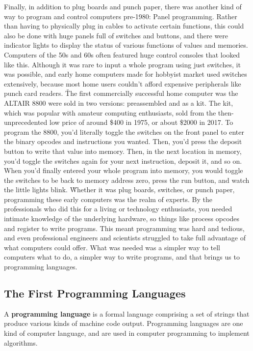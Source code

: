Finally, in addition to plug boards and punch paper, there was another kind of way to program and control computers
pre-1980: Panel programming. Rather than having to physically plug in cables to activate certain functions, this
could also be done with huge panels full of switches and buttons, and there were indicator lights to display the
status of various functions of values and memories. Computers of the 50s and 60s often featured huge control consoles
that looked like this. Although it was rare to input a whole program using just switches, it was possible, and early
home computers made for hobbyist market used switches extensively, because most home users couldn't afford expensive
peripherals like punch card readers. \v

The first commercially successful home computer was the ALTAIR 8800 were sold in two versions: preassembled and as a
kit. The kit, which was popular with amateur computing enthusiasts, sold from the then-unprecedented low price of
around \$400 in 1975, or about \$2000 in 2017. To program the 8800, you'd literally toggle the switches on the front
panel to enter the binary opcodes and instructions you wanted. Then, you'd press the deposit button to write that
value into memory. Then, in the next location in memory, you'd toggle the switches again for your next instruction,
deposit it, and so on. When you'd finally entered your whole program into memory, you would toggle the switches to be
back to memory address zero, press the run button, and watch the little lights blink. \v

Whether it was plug boards, switches, or punch paper, programming these early computers was the realm of experts. By
the professionals who did this for a living or technology enthusiasts, you needed intimate knowledge of the
underlying hardware, so things like process opcodes and register to write programs. This meant programming was hard
and tedious, and even professional engineers and scientists struggled to take full advantage of what computers could
offer. What was needed was a simpler way to tell computers what to do, a simpler way to write programs, and that
brings us to programming languages.

\subsection{The First Programming Languages}

A \textbf{programming language} is a formal language comprising a set of strings that produce various kinds of
machine code output. Programming languages are one kind of computer language, and are used in computer programming to
implement algorithms.
\ed


